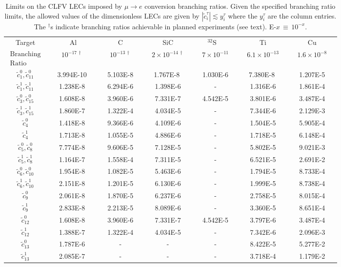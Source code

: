 \documentclass{book}[letterpaper,12pt]
\begin{document}
\begin{table}
\label{tab:LEC_limits}
\caption{Limits on the CLFV LECs imposed by $\mu \rightarrow e$ conversion branching ratios. 
Given the specified branching ratio limits, the allowed values of the dimensionless LECs are 
given by $|\tilde{c}_i^\tau| \lesssim y_i^\tau$ where the $y_i^\tau$ are the column entries.  The $^\dagger$s indicate  
branching ratios achievable in planned experiments (see text).   E-$x \, \equiv \,10^{-x}.$}
\begin{tabular}{ccccccc}
\hline
\hline
Target  &~~~~~ Al~~~~~&~~~~~C~~~~~&~~~~SiC~~~~&~~~$^{32}$S~~~~~&~~~~~Ti~~~~~&~~~~~Cu~~~~~ \\[1.6pt]
$\begin{array}{l} \mathrm{Branching} \\  \mathrm{Ratio} \end{array}$ & $10^{-17 \, \dagger}$ & $10^{-13 \, \dagger}$ & $2 \times 10^{-14 \, \dagger}$ & $7 \times 10^{-11}$ \cite{BADERTSCHER1982406} &  $6.1 \times 10^{-13}$ \cite{wintz} & $1.6 \times 10^{-8}$ \cite{PhysRevLett.28.1469} \\
\hline
$\tilde{c}_1^0,\tilde{c}_{11}^0$ &~~3.994E-10~~ & ~~5.103E-8~~ & ~~1.767E-8 ~~& ~~1.030E-6~~ & ~~7.380E-8 ~~& ~~1.207E-5~~ \\
$\tilde{c}_1^1,\tilde{c}_{11}^1$ &1.238E-8 & 6.294E-6 & 1.398E-6 & - & 1.316E-6 & 1.861E-4 \\
$\tilde{c}_3^0,\tilde{c}_{15}^0$ &1.608E-8 & 3.960E-6 &7.331E-7 & 4.542E-5 & 3.801E-6 & 3.487E-4 \\
$\tilde{c}_3^1,\tilde{c}_{15}^1$ &1.860E-7 & 1.322E-4 & 4.034E-5 & - & 7.344E-6 & 2.129E-3 \\
$\tilde{c}_4^0$ & 1.418E-8 & 9.366E-6 & 4.109E-6 & - & 1.504E-5 & 5.905E-4 \\
$\tilde{c}_4^1$ & 1.713E-8 & 1.055E-5 & 4.886E-6 & - & 1.718E-5 & 6.148E-4 \\
$\tilde{c}_5^0,\tilde{c}_8^0$ &7.774E-8 & 9.606E-5 & 7.128E-5 & - & 5.802E-5 & 9.021E-3 \\
$\tilde{c}_5^1,\tilde{c}_8^1$ &1.164E-7 & 1.558E-4 & 7.311E-5 & - & 6.521E-5 & 2.691E-2 \\
$\tilde{c}_6^0,\tilde{c}_{10}^0$ & 1.954E-8 & 1.082E-5 & 5.463E-6 & - & 1.794E-5 & 8.733E-4 \\
$\tilde{c}_6^1,\tilde{c}_{10}^1$ & 2.151E-8 & 1.201E-5 & 6.130E-6 & - & 1.999E-5 & 8.738E-4 \\
$\tilde{c}_9^0$ & 2.061E-8 & 1.870E-5 & 6.237E-6 & - & 2.758E-5 & 8.015E-4 \\
$\tilde{c}_9^1$ & 2.833E-8 & 2.213E-5 & 8.089E-6 & - & 3.360E-5 & 8.651E-4 \\
$\tilde{c}_{12}^0$ & 1.608E-8 & 3.960E-6 & 7.331E-7 & 4.542E-5 & 3.797E-6 & 3.487E-4 \\
$\tilde{c}_{12}^1$ & 1.388E-7 & 1.322E-4 & 4.034E-5 & - & 7.342E-6 & 2.096E-3 \\
$\tilde{c}_{13}^0$ & 1.787E-6 & - & - & - & 8.422E-5 & 5.277E-2 \\
$\tilde{c}_{13}^1$ & 2.085E-7 & - & - & - & 3.718E-4 & 1.179E-2 \\[2.6pt]
\hline
\hline
\end{tabular}
\end{table} 
\end{document}
